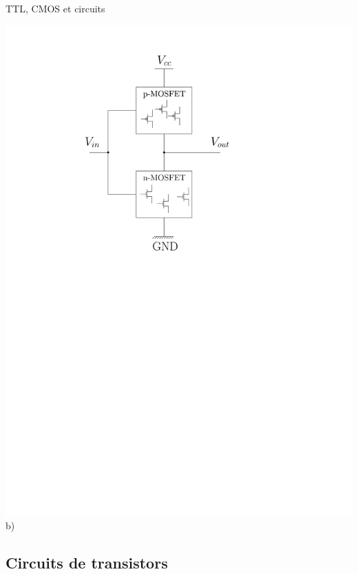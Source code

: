 \documentclass{beamer}
\begin{document}
\begin{frame}
\begin{block}{TTL, CMOS et circuits}
\begin{minipage}[c]{.25\linewidth}
\includegraphics[width=\columnwidth]{Figs/circuits_mos.pdf}\\\centering b)
   \end{minipage}
\end{block}
\end{frame}

\subsection{Circuits de transistors}
\end{document}
